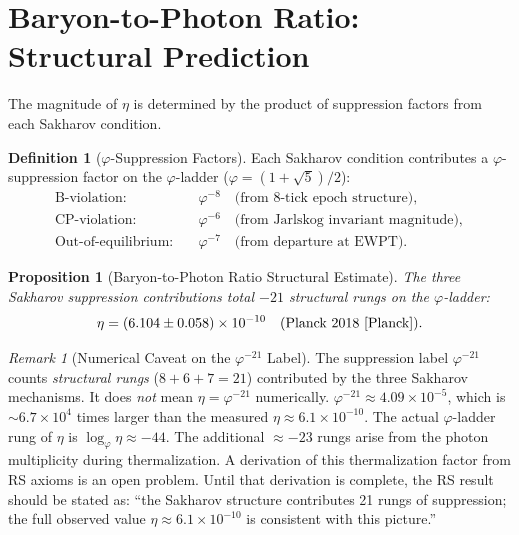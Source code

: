 \documentclass[12pt,a4paper]{article}
\newtheorem{proposition}[theorem]{Proposition}
\theoremstyle{definition}
\newtheorem{definition}[theorem]{Definition}
\theoremstyle{remark}
\newtheorem{remark}[theorem]{Remark}
\begin{document}
\section{Baryon-to-Photon Ratio: Structural Prediction}
\label{sec:eta}

The magnitude of $\eta$ is determined by the product of suppression
factors from each Sakharov condition.

\begin{definition}[$\varphi$-Suppression Factors]
Each Sakharov condition contributes a $\varphi$-suppression factor on
the $\varphi$-ladder ($\varphi = (1+\sqrt{5})/2$):
\begin{align}
  \text{B-violation:} \quad &\varphi^{-8} \quad
  \text{(from 8-tick epoch structure)}, \\
  \text{CP-violation:} \quad &\varphi^{-6} \quad
  \text{(from Jarlskog invariant magnitude)}, \\
  \text{Out-of-equilibrium:} \quad &\varphi^{-7} \quad
  \text{(from departure at EWPT)}.
\end{align}
\end{definition}

\begin{proposition}[Baryon-to-Photon Ratio Structural Estimate]
\label{thm:eta}
The three Sakharov suppression contributions total $-21$ structural
rungs on the $\varphi$-ladder:
\begin{equation}
  \eta = (6.104 \pm 0.058) \times 10^{-10}
  \quad (\text{Planck 2018~\cite{Planck}}).
\end{equation}
\end{proposition}

\begin{remark}[Numerical Caveat on the $\varphi^{-21}$ Label]
\label{rem:eta-numerical}
The suppression label $\varphi^{-21}$ counts \emph{structural rungs}
($8+6+7=21$) contributed by the three Sakharov mechanisms.  It does
\emph{not} mean $\eta = \varphi^{-21}$ numerically.
$\varphi^{-21} \approx 4.09 \times 10^{-5}$, which is $\sim 6.7
\times 10^4$ times larger than the measured $\eta \approx 6.1
\times 10^{-10}$.  The actual $\varphi$-ladder rung of $\eta$ is
$\log_\varphi \eta \approx -44$.  The additional $\approx -23$ rungs
arise from the photon multiplicity during thermalization.  A
derivation of this thermalization factor from RS axioms is an open
problem.  Until that derivation is complete, the RS result should be
stated as: ``the Sakharov structure contributes 21 rungs of
suppression; the full observed value $\eta \approx 6.1 \times
10^{-10}$ is consistent with this picture.''
\end{remark}
\end{document}
